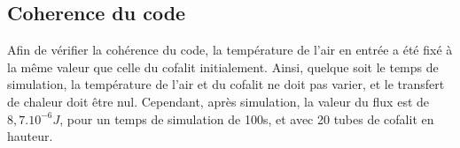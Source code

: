 \subsection{Coherence du code}

Afin de vérifier la cohérence du code, la température de l'air en entrée a été fixé à la même valeur que celle du cofalit initialement.
Ainsi, quelque soit le temps de simulation, la température de l'air et du cofalit ne doit pas varier, et le transfert de chaleur doit être nul. 
Cependant, après simulation, la valeur du flux est de $8,7.10^{-6}J$, pour un temps de simulation de 100s, et avec 20 tubes de cofalit en hauteur.

